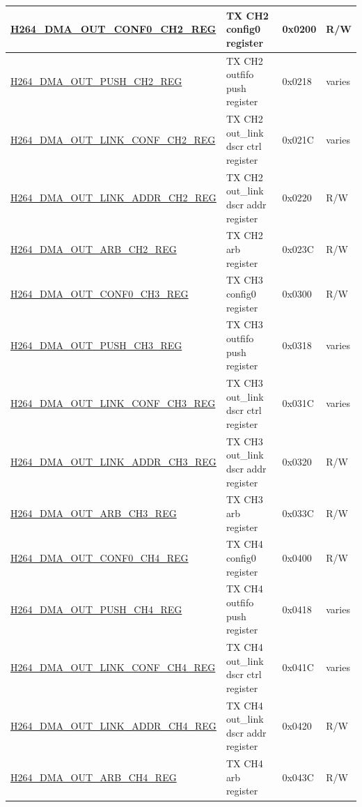 \begin{longtable}{ | p{7.5cm} | p{5.7cm} | p{1.2cm} | p{1.5cm} | }
\hyperref[regdesc:H264DMAOUTCONF0CH2REG]{H264\_DMA\_OUT\_CONF0\_CH2\_REG} & TX CH2 config0 register & 0x0200 & R/W \\ \hline
\hyperref[regdesc:H264DMAOUTPUSHCH2REG]{H264\_DMA\_OUT\_PUSH\_CH2\_REG} & TX CH2 outfifo push register & 0x0218 & varies \\ \hline
\hyperref[regdesc:H264DMAOUTLINKCONFCH2REG]{H264\_DMA\_OUT\_LINK\_CONF\_CH2\_REG} & TX CH2 out\_link dscr ctrl register & 0x021C & varies \\ \hline
\hyperref[regdesc:H264DMAOUTLINKADDRCH2REG]{H264\_DMA\_OUT\_LINK\_ADDR\_CH2\_REG} & TX CH2 out\_link dscr addr register & 0x0220 & R/W \\ \hline
\hyperref[regdesc:H264DMAOUTARBCH2REG]{H264\_DMA\_OUT\_ARB\_CH2\_REG} & TX CH2 arb register & 0x023C & R/W \\ \hline

\hyperref[regdesc:H264DMAOUTCONF0CH3REG]{H264\_DMA\_OUT\_CONF0\_CH3\_REG} & TX CH3 config0 register & 0x0300 & R/W \\ \hline
\hyperref[regdesc:H264DMAOUTPUSHCH3REG]{H264\_DMA\_OUT\_PUSH\_CH3\_REG} & TX CH3 outfifo push register & 0x0318 & varies \\ \hline
\hyperref[regdesc:H264DMAOUTLINKCONFCH3REG]{H264\_DMA\_OUT\_LINK\_CONF\_CH3\_REG} & TX CH3 out\_link dscr ctrl register & 0x031C & varies \\ \hline
\hyperref[regdesc:H264DMAOUTLINKADDRCH3REG]{H264\_DMA\_OUT\_LINK\_ADDR\_CH3\_REG} & TX CH3 out\_link dscr addr register & 0x0320 & R/W \\ \hline
\hyperref[regdesc:H264DMAOUTARBCH3REG]{H264\_DMA\_OUT\_ARB\_CH3\_REG} & TX CH3 arb register & 0x033C & R/W \\ \hline

\hyperref[regdesc:H264DMAOUTCONF0CH4REG]{H264\_DMA\_OUT\_CONF0\_CH4\_REG} & TX CH4 config0 register & 0x0400 & R/W \\ \hline
\hyperref[regdesc:H264DMAOUTPUSHCH4REG]{H264\_DMA\_OUT\_PUSH\_CH4\_REG} & TX CH4 outfifo push register & 0x0418 & varies \\ \hline
\hyperref[regdesc:H264DMAOUTLINKCONFCH4REG]{H264\_DMA\_OUT\_LINK\_CONF\_CH4\_REG} & TX CH4 out\_link dscr ctrl register & 0x041C & varies \\ \hline
\hyperref[regdesc:H264DMAOUTLINKADDRCH4REG]{H264\_DMA\_OUT\_LINK\_ADDR\_CH4\_REG} & TX CH4 out\_link dscr addr register & 0x0420 & R/W \\ \hline
\hyperref[regdesc:H264DMAOUTARBCH4REG]{H264\_DMA\_OUT\_ARB\_CH4\_REG} & TX CH4 arb register & 0x043C & R/W \\ \hline


\end{longtable}
